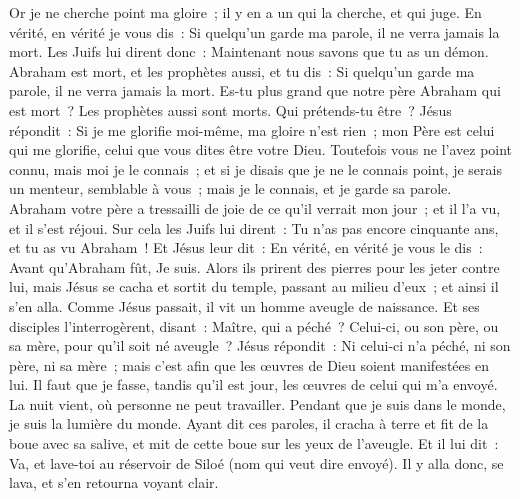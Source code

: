\begin{multicols}{2}
Or je ne cherche point ma gloire~; il y en a un qui la cherche, et qui juge.
En vérité, en vérité je vous dis~: Si quelqu'un garde ma parole, il ne verra jamais la mort.
Les Juifs lui dirent donc~: Maintenant nous savons que tu as un démon. Abraham est mort, et les prophètes aussi, et tu dis~: Si quelqu'un garde ma parole, il ne verra jamais la mort.
Es-tu plus grand que notre père Abraham qui est mort~? Les prophètes aussi sont morts. Qui prétends-tu être~?
Jésus répondit~: Si je me glorifie moi-même, ma gloire n'est rien~; mon Père est celui qui me glorifie, celui que vous dites être votre Dieu.
Toutefois vous ne l'avez point connu, mais moi je le connais~; et si je disais que je ne le connais point, je serais un menteur, semblable à vous~; mais je le connais, et je garde sa parole.
Abraham votre père a tressailli de joie de ce qu'il verrait mon jour~; et il l'a vu, et il s'est réjoui.
Sur cela les Juifs lui dirent~: Tu n'as pas encore cinquante ans, et tu as vu Abraham~!
Et Jésus leur dit~: En vérité, en vérité je vous le dis~: Avant qu'Abraham fût, Je suis.
Alors ils prirent des pierres pour les jeter contre lui, mais Jésus se cacha et sortit du temple, passant au milieu d'eux~; et ainsi il s'en alla.
\VerseOne{}Comme Jésus passait, il vit un homme aveugle de naissance.
Et ses disciples l'interrogèrent, disant~: Maître, qui a péché~? Celui-ci, ou son père, ou sa mère, pour qu'il soit né aveugle~?
Jésus répondit~: Ni celui-ci n'a péché, ni son père, ni sa mère~; mais c'est afin que les œuvres de Dieu soient manifestées en lui.
Il faut que je fasse, tandis qu'il est jour, les œuvres de celui qui m'a envoyé. La nuit vient, où personne ne peut travailler.
Pendant que je suis dans le monde, je suis la lumière du monde.
Ayant dit ces paroles, il cracha à terre et fit de la boue avec sa salive, et mit de cette boue sur les yeux de l'aveugle.
Et il lui dit~: Va, et lave-toi au réservoir de Siloé (nom qui veut dire envoyé). Il y alla donc, se lava, et s'en retourna voyant clair.

\end{multicols}
